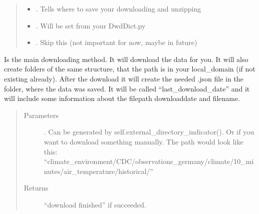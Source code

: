 \documentclass[letterpaper,10pt,english]{sphinxmanual}
\begin{document}
\begin{fulllineitems}
\begin{fulllineitems}
\begin{quote}
\begin{description}
\begin{itemize}
\item {} 
\sphinxAtStartPar
{} \textendash{} . Tells where to save your downloading and unzipping

\item {} 
\sphinxAtStartPar
{} \textendash{} . Will be set from your DwdDict.py

\item {} 
\sphinxAtStartPar
{} \textendash{} . Skip this (not important for now, maybe in future)

\end{itemize}

\end{description}\end{quote}

\end{fulllineitems}


\begin{fulllineitems}
\label{\detokenize{DwdDataScrapper:DwdDataScrapper.DataScrapper.download}}
\sphinxAtStartPar
{} Is the main downloading method. It will download the data for you. It will also create folders of the same structure,
that the path is in your local\_domain (if not existing already). After the download it will create the needed .json file in the folder,
where the data was saved. It will be called “last\_download\_date” and it will include some information about the filepath download\sphinxhyphen{}date and filename.
\begin{quote}\begin{description}
\item[{Parameters}] \leavevmode
\sphinxAtStartPar
{} \textendash{} . Can be generated by self.external\_directory\_indicator(). Or if you want to download something manually. The path would look like this: “climate\_environment/CDC/observations\_germany/climate/10\_minutes/air\_temperature/historical/”

\item[{Returns}] \leavevmode
\sphinxAtStartPar
“download finished” if succeeded.


\end{description}
\end{quote}
\end{fulllineitems}
\end{fulllineitems}
\end{document}
